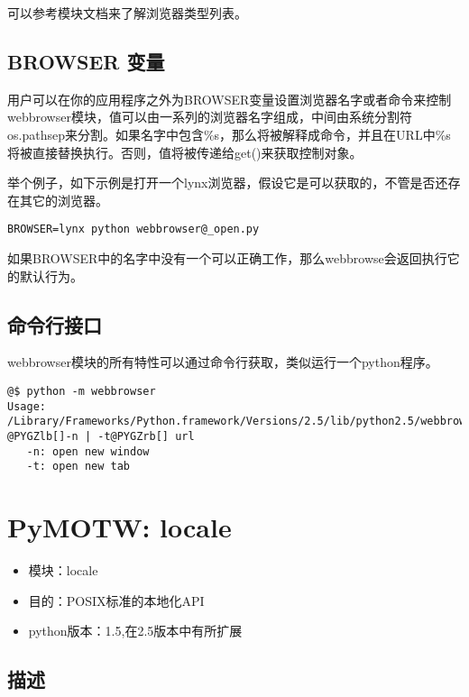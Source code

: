 \documentclass[letterpaper,10pt,english]{manual}
\begin{document}
可以参考模块文档来了解浏览器类型列表。


\subsection{BROWSER 变量}

用户可以在你的应用程序之外为BROWSER变量设置浏览器名字或者命令来控制webbrowser模块，值可以由一系列的浏览器名字组成，中间由系统分割符os.pathsep来分割。如果名字中包含\%s，那么将被解释成命令，并且在URL中\%s将被直接替换执行。否则，值将被传递给get()来获取控制对象。

举个例子，如下示例是打开一个lynx浏览器，假设它是可以获取的，不管是否还存在其它的浏览器。

\begin{Verbatim}[commandchars=@\[\]]
BROWSER=lynx python webbrowser@_open.py
\end{Verbatim}

如果BROWSER中的名字中没有一个可以正确工作，那么webbrowse会返回执行它的默认行为。


\subsection{命令行接口}

webbrowser模块的所有特性可以通过命令行获取，类似运行一个python程序。

\begin{Verbatim}[commandchars=@\[\]]
@$ python -m webbrowser
Usage: /Library/Frameworks/Python.framework/Versions/2.5/lib/python2.5/webbrowser.py @PYGZlb[]-n | -t@PYGZrb[] url
   -n: open new window
   -t: open new tab
\end{Verbatim}

\resetcurrentobjects


\section{PyMOTW: locale}
\begin{itemize}
\item {} 
模块：locale

\item {} 
目的：POSIX标准的本地化API

\item {} 
python版本：1.5,在2.5版本中有所扩展

\end{itemize}


\subsection{描述}
\end{document}
